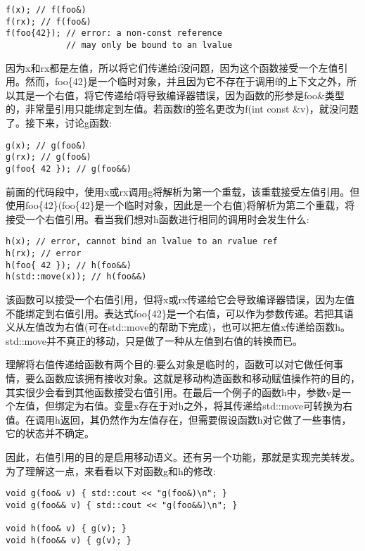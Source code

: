 \begin{lstlisting}[style=styleCXX]
f(x); // f(foo&)
f(rx); // f(foo&)
f(foo{42}); // error: a non-const reference
            // may only be bound to an lvalue
\end{lstlisting}

因为x和rx都是左值，所以将它们传递给f没问题，因为这个函数接受一个左值引用。然而，foo\{42\}是一个临时对象，并且因为它不存在于调用f的上下文之外，所以其是一个右值，将它传递给f将导致编译器错误，因为函数的形参是foo\&类型的，非常量引用只能绑定到左值。若函数f的签名更改为f(int const \&v)，就没问题了。接下来，讨论g函数:

\begin{lstlisting}[style=styleCXX]
g(x); // g(foo&)
g(rx); // g(foo&)
g(foo{ 42 }); // g(foo&&)
\end{lstlisting}

前面的代码段中，使用x或rx调用g将解析为第一个重载，该重载接受左值引用。但使用foo\{42\}(foo\{42\}是一个临时对象，因此是一个右值)将解析为第二个重载，将接受一个右值引用。看当我们想对h函数进行相同的调用时会发生什么:

\begin{lstlisting}[style=styleCXX]
h(x); // error, cannot bind an lvalue to an rvalue ref
h(rx); // error
h(foo{ 42 }); // h(foo&&)
h(std::move(x)); // h(foo&&)
\end{lstlisting}

该函数可以接受一个右值引用，但将x或rx传递给它会导致编译器错误，因为左值不能绑定到右值引用。表达式foo\{42\}是一个右值，可以作为参数传递。若把其语义从左值改为右值(可在std::move的帮助下完成)，也可以把左值x传递给函数h。std::move并不真正的移动，只是做了一种从左值到右值的转换而已。

理解将右值传递给函数有两个目的:要么对象是临时的，函数可以对它做任何事情，要么函数应该拥有接收对象。这就是移动构造函数和移动赋值操作符的目的，其实很少会看到其他函数接受右值引用。在最后一个例子的函数h中，参数v是一个左值，但绑定为右值。变量x存在于对h之外，将其传递给std::move可转换为右值。在调用h返回，其仍然作为左值存在，但需要假设函数h对它做了一些事情，它的状态并不确定。

因此，右值引用的目的是启用移动语义。还有另一个功能，那就是实现完美转发。为了理解这一点，来看看以下对函数g和h的修改:

\begin{lstlisting}[style=styleCXX]
void g(foo& v) { std::cout << "g(foo&)\n"; }
void g(foo&& v) { std::cout << "g(foo&&)\n"; }

void h(foo& v) { g(v); }
void h(foo&& v) { g(v); }
\end{lstlisting}

